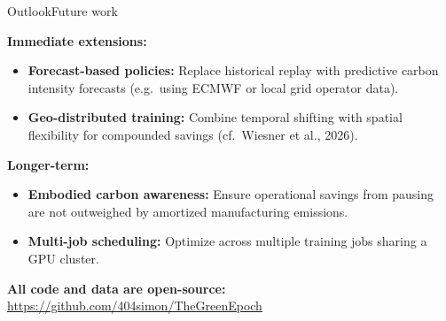 \begin{frame}[t]{Outlook}{Future work}

  \textbf{Immediate extensions:}
  \begin{itemize}
    \item \textbf{Forecast-based policies:} Replace historical replay with
      predictive carbon intensity forecasts (e.g.\ using ECMWF or
      local grid operator data).
    \item \textbf{Geo-distributed training:} Combine temporal shifting with
      spatial flexibility for compounded savings (cf.\ Wiesner et al., 2026).
  \end{itemize}

  \vspace{0.3cm}
  \textbf{Longer-term:}
  \begin{itemize}
    \item \textbf{Embodied carbon awareness:} Ensure operational savings from
      pausing are not outweighed by amortized manufacturing emissions.
    \item \textbf{Multi-job scheduling:} Optimize across multiple training jobs
      sharing a GPU cluster.
  \end{itemize}

  \vspace{0.5cm}
  \begin{center}
    \textbf{All code and data are open-source:}\\
    \url{https://github.com/404simon/TheGreenEpoch}
  \end{center}

\end{frame}
